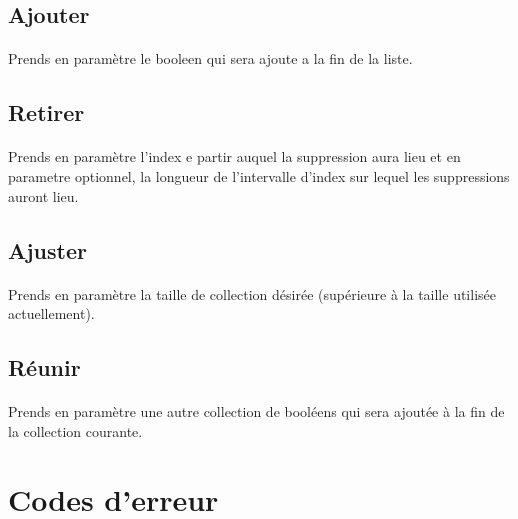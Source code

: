 \documentclass[a4paper, 12pts]{article}
\begin{document}
\subsection{Ajouter}

\paragraph{}
Prends en paramètre le booleen qui sera ajoute a la fin de la liste.

\subsection{Retirer}

\paragraph{}
Prends en paramètre l'index e partir auquel la suppression aura lieu et en parametre optionnel, la longueur de l'intervalle d'index sur lequel les suppressions auront lieu.

\subsection{Ajuster}

\paragraph{}
Prends en paramètre la taille de collection désirée (supérieure à la taille utilisée actuellement).

\subsection{Réunir}

\paragraph{}
Prends en paramètre une autre collection de booléens qui sera ajoutée à la fin de la collection courante.


\section{Codes d'erreur}
\end{document}
